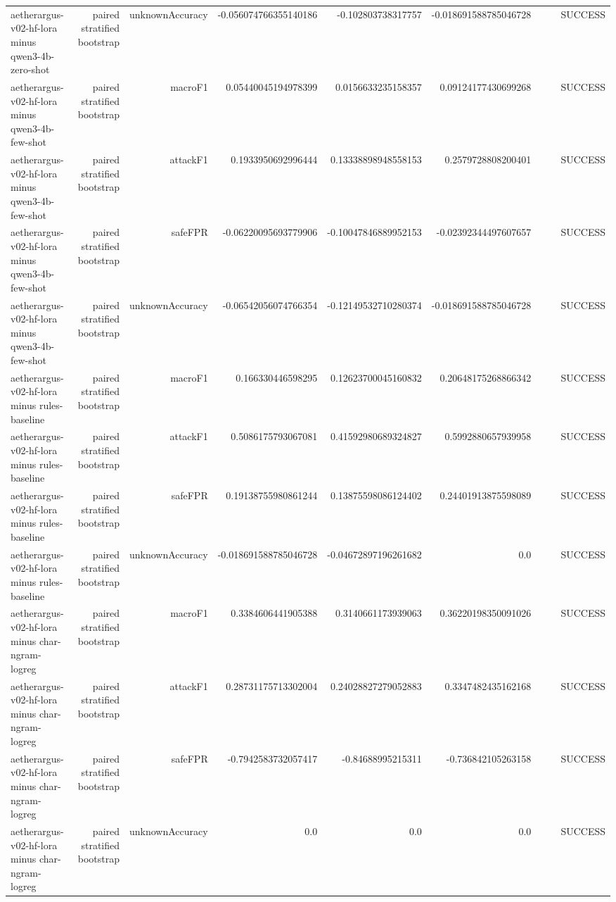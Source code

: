 \begin{table}[t]
\begin{tabular}{lrrrrrrrr}
aetherargus-v02-hf-lora minus qwen3-4b-zero-shot & paired stratified bootstrap & unknownAccuracy & -0.056074766355140186 & -0.102803738317757 & -0.018691588785046728 &  &  & SUCCESS \\
aetherargus-v02-hf-lora minus qwen3-4b-few-shot & paired stratified bootstrap & macroF1 & 0.05440045194978399 & 0.0156633235158357 & 0.09124177430699268 &  &  & SUCCESS \\
aetherargus-v02-hf-lora minus qwen3-4b-few-shot & paired stratified bootstrap & attackF1 & 0.1933950692996444 & 0.13338898948558153 & 0.2579728808200401 &  &  & SUCCESS \\
aetherargus-v02-hf-lora minus qwen3-4b-few-shot & paired stratified bootstrap & safeFPR & -0.06220095693779906 & -0.10047846889952153 & -0.02392344497607657 &  &  & SUCCESS \\
aetherargus-v02-hf-lora minus qwen3-4b-few-shot & paired stratified bootstrap & unknownAccuracy & -0.06542056074766354 & -0.12149532710280374 & -0.018691588785046728 &  &  & SUCCESS \\
aetherargus-v02-hf-lora minus rules-baseline & paired stratified bootstrap & macroF1 & 0.166330446598295 & 0.12623700045160832 & 0.20648175268866342 &  &  & SUCCESS \\
aetherargus-v02-hf-lora minus rules-baseline & paired stratified bootstrap & attackF1 & 0.5086175793067081 & 0.41592980689324827 & 0.5992880657939958 &  &  & SUCCESS \\
aetherargus-v02-hf-lora minus rules-baseline & paired stratified bootstrap & safeFPR & 0.19138755980861244 & 0.13875598086124402 & 0.24401913875598089 &  &  & SUCCESS \\
aetherargus-v02-hf-lora minus rules-baseline & paired stratified bootstrap & unknownAccuracy & -0.018691588785046728 & -0.04672897196261682 & 0.0 &  &  & SUCCESS \\
aetherargus-v02-hf-lora minus char-ngram-logreg & paired stratified bootstrap & macroF1 & 0.3384606441905388 & 0.3140661173939063 & 0.36220198350091026 &  &  & SUCCESS \\
aetherargus-v02-hf-lora minus char-ngram-logreg & paired stratified bootstrap & attackF1 & 0.28731175713302004 & 0.24028827279052883 & 0.3347482435162168 &  &  & SUCCESS \\
aetherargus-v02-hf-lora minus char-ngram-logreg & paired stratified bootstrap & safeFPR & -0.7942583732057417 & -0.84688995215311 & -0.736842105263158 &  &  & SUCCESS \\
aetherargus-v02-hf-lora minus char-ngram-logreg & paired stratified bootstrap & unknownAccuracy & 0.0 & 0.0 & 0.0 &  &  & SUCCESS \\

\end{tabular}
\end{table}
